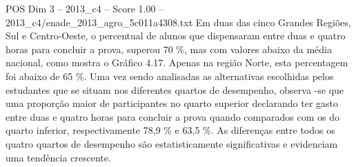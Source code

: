 \begin{textsample}{POS Dim 3 – 2013\_c4 – Score 1.00 – 2013\_c4/enade\_2013\_agro\_5c011a4308.txt}
Em duas das cinco Grandes Regiões, Sul e Centro-Oeste, o percentual de alunos que dispensaram entre duas e quatro horas para concluir a prova, superou 70 \%, mas com valores abaixo da média nacional, como mostra o Gráfico 4.17.
Apenas na região Norte, esta percentagem foi abaixo de 65 \%.
Uma vez sendo analisadas as alternativas escolhidas pelos estudantes que se situam nos diferentes quartos de desempenho, observa -se que uma proporção maior de participantes no quarto superior declarando ter gasto entre duas e quatro horas para concluir a prova quando comparados com os do quarto inferior, respectivamente 78,9 \% e 63,5 \%.
As diferenças entre todos os quatro quartos de desempenho são estatisticamente significativas e evidenciam uma tendência crescente.

\end{textsample}

